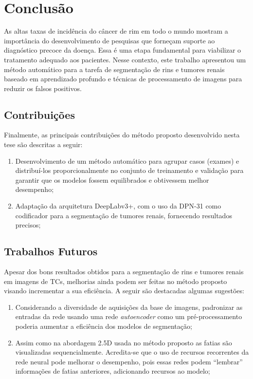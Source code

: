 \chapter{Conclusão}
\label{cap:conclusao}

As altas taxas de incidência do câncer de rim em todo o mundo mostram a importância do desenvolvimento de pesquisas que forneçam suporte ao diagnóstico precoce da doença. Essa é uma etapa fundamental para viabilizar o tratamento adequado aos pacientes. Nesse contexto, este trabalho apresentou um método automático para a tarefa de segmentação de rins e tumores renais baseado em aprendizado profundo e técnicas de processamento de imagens para reduzir os falsos positivos.



\section{Contribuições}
\label{sec:contribuições}

Finalmente, as principais contribuições do método proposto desenvolvido nesta tese são descritas a seguir:

\begin{enumerate}
    \item Desenvolvimento de um método automático para agrupar casos (exames) e distribuí-los proporcionalmente no conjunto de treinamento e validação para garantir que os modelos fossem equilibrados e obtivessem melhor desempenho;
    
    \item Adaptação da arquitetura DeepLabv3+, com o uso da DPN-31 como codificador para a segmentação de tumores renais, fornecendo resultados precisos;
    
   
\end{enumerate}

\section{Trabalhos Futuros}
\label{sec:trabalhos-futuros}

Apesar dos bons resultados obtidos para a segmentação de rins e tumores renais em imagens de TCs, melhorias ainda podem ser feitas no método proposto visando incrementar a sua eficiência. A seguir são destacadas algumas sugestões:

\begin{enumerate}
    \item Considerando a diversidade de aquisições da base de imagens, padronizar as entradas da rede usando uma rede \textit{autoencoder} como um pré-processamento poderia aumentar a eficiência dos modelos de segmentação;
    
    \item Assim como na abordagem 2.5D usada no método proposto as fatias são visualizadas sequencialmente. Acredita-se que o uso de recursos recorrentes da rede neural pode melhorar o desempenho, pois essas redes podem “lembrar” informações de fatias anteriores, adicionando recursos ao modelo;
    
  
\end{enumerate}

